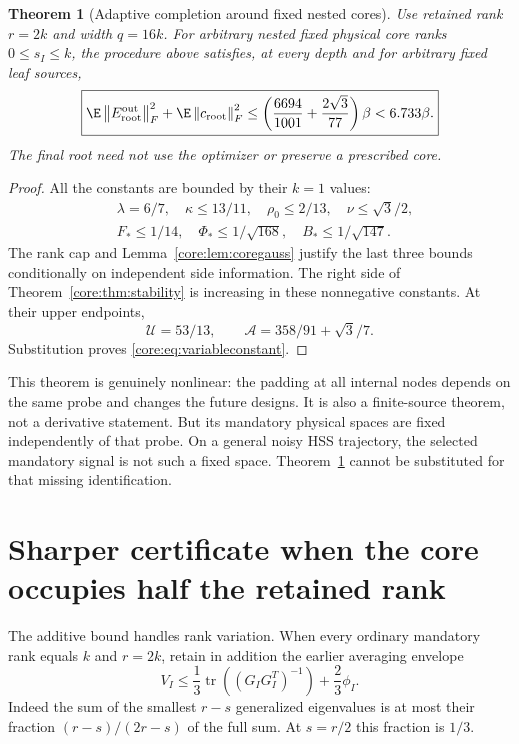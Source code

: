 \documentclass[11pt,oneside,openany,a4paper]{book}
\numberwithin{equation}{chapter}
\newtheorem{theorem}{Theorem}[chapter]
\theoremstyle{definition}
\theoremstyle{remark}
\newcommand{\F}[1]{\left\lVert#1\right\rVert_F}
\DeclareMathOperator{\tr}{tr}\DeclareMathOperator{\rank}{rank}
\begin{document}
\begin{theorem}[Adaptive completion around fixed nested cores]\label{core:thm:anchored}
Use retained rank $r=2k$ and width $q=16k$. For arbitrary nested fixed physical core ranks $0\le s_I\le k$, the procedure above satisfies, at every depth and for arbitrary fixed leaf sources,
\begin{equation}\label{core:eq:variableconstant}
 \boxed{\E\F{E_{\rm root}^{\rm out}}^2+\E\F{c_{\rm root}}^2
 \le\left(\frac{6694}{1001}+\frac{2\sqrt3}{77}\right)\beta
 <6.733\beta.}
\end{equation}
The final root need not use the optimizer or preserve a prescribed core.
\end{theorem}
\begin{proof}
All the constants are bounded by their $k=1$ values:
\[
 \begin{aligned}
 &\lambda=6/7,\quad \kappa\le13/11,\quad \rho_0\le2/13,\quad \nu\le\sqrt3/2,\\
 &F_*\le1/14,\quad \Phi_*\le1/\sqrt{168},\quad B_*\le1/\sqrt{147}.
 \end{aligned}
\]
The rank cap and Lemma~\ref{core:lem:coregauss} justify the last three bounds conditionally on independent side information. The right side of Theorem~\ref{core:thm:stability} is increasing in these nonnegative constants. At their upper endpoints,
\[
 \mathcal U=53/13,\qquad
 \mathcal A=358/91+\sqrt3/7.
\]
Substitution proves \eqref{core:eq:variableconstant}.
\end{proof}

This theorem is genuinely nonlinear: the padding at all internal nodes depends on the same probe and changes the future designs. It is also a finite-source theorem, not a derivative statement. But its mandatory physical spaces are fixed independently of that probe. On a general noisy HSS trajectory, the selected mandatory signal is not such a fixed space. Theorem~\ref{core:thm:anchored} cannot be substituted for that missing identification.

\section{Sharper certificate when the core occupies half the retained rank}\label{core:sec:sharp}
The additive bound handles rank variation. When every ordinary mandatory rank equals $k$ and $r=2k$, retain in addition the earlier averaging envelope
\begin{equation}\label{core:eq:average}
 V_I\le\frac13\tr((G_IG_I^T)^{-1})+\frac23\phi_I.
\end{equation}
Indeed the sum of the smallest $r-s$ generalized eigenvalues is at most their fraction $(r-s)/(2r-s)$ of the full sum. At $s=r/2$ this fraction is $1/3$.
\end{document}
